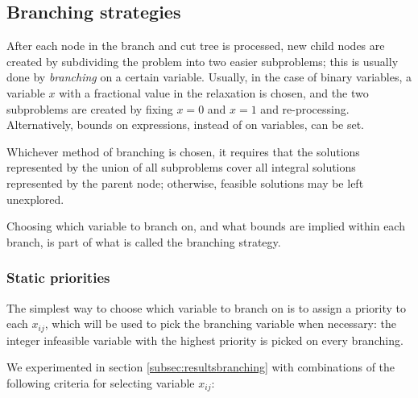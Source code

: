 \subsection{Branching strategies}
\label{subsec:alg:branching}

After each node in the branch and cut tree is processed, new child nodes are created by subdividing the problem into two easier subproblems; this is usually done by \textit{branching} on a certain variable. Usually, in the case of binary variables, a variable $x$ with a fractional value in the relaxation is chosen, and the two subproblems are created by fixing $x = 0$ and $x = 1$ and re-processing. Alternatively, bounds on expressions, instead of on variables, can be set.

\begin{figure}[h]
	\label{fig:branching}
	\centering
\end{figure}

Whichever method of branching is chosen, it requires that the solutions represented by the union of all subproblems cover all integral solutions represented by the parent node; otherwise, feasible solutions may be left unexplored.

Choosing which variable to branch on, and what bounds are implied within each branch, is part of what is called the branching strategy. 

\subsubsection{Static priorities}

The simplest way to choose which variable to branch on is to assign a priority to each $x_{ij}$, which will be used to pick the branching variable when necessary: the integer infeasible variable with the highest priority is picked on every branching. 

We experimented in section \ref{subsec:resultsbranching} with combinations of the following criteria for selecting variable $x_{ij}$:

